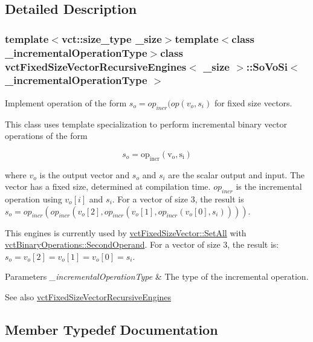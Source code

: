 \subsection{Detailed Description}
\subsubsection*{template$<$vct\+::size\+\_\+type \+\_\+size$>$template$<$class \+\_\+incremental\+Operation\+Type$>$class vct\+Fixed\+Size\+Vector\+Recursive\+Engines$<$ \+\_\+size $>$\+::\+So\+Vo\+Si$<$ \+\_\+incremental\+Operation\+Type $>$}

Implement operation of the form $s_o = op_{incr}(op(v_o, s_i)$ for fixed size vectors. 

This class uses template specialization to perform incremental binary vector operations of the form

\[ s_o = \mathrm{op_{incr}(v_{o}, s_i)} \]

where $v_{o}$ is the output vector and $s_o$ and $s_i$ are the scalar output and input. The vector has a fixed size, determined at compilation time. $op_{incr}$ is the incremental operation using $v_{o}[i]$ and $s_i$. For a vector of size 3, the result is $s_o = op_{incr}(op_{incr}(v_o[2], op_{incr}(v_o[1], op_{incr}(v_o[0], s_i))))$.

This engines is currently used by \hyperlink{classvct_fixed_size_vector_base_ae0659dd664fd0be5b5c4ff9c2d13c64e}{vct\+Fixed\+Size\+Vector\+::\+Set\+All} with \hyperlink{classvct_binary_operations_1_1_second_operand}{vct\+Binary\+Operations\+::\+Second\+Operand}. For a vector of size 3, the result is\+: $s_o = v_o[2] = v_o[1] = v_o[0] = s_i$.


\begin{DoxyParams}{Parameters}
{\em \+\_\+incremental\+Operation\+Type} & The type of the incremental operation.\\
\hline
\end{DoxyParams}
\begin{DoxySeeAlso}{See also}
\hyperlink{classvct_fixed_size_vector_recursive_engines}{vct\+Fixed\+Size\+Vector\+Recursive\+Engines} 
\end{DoxySeeAlso}


\subsection{Member Typedef Documentation}
\hypertarget{classvct_fixed_size_vector_recursive_engines_1_1_so_vo_si_abbe36310e19f37465a117598a680abe5}{}
